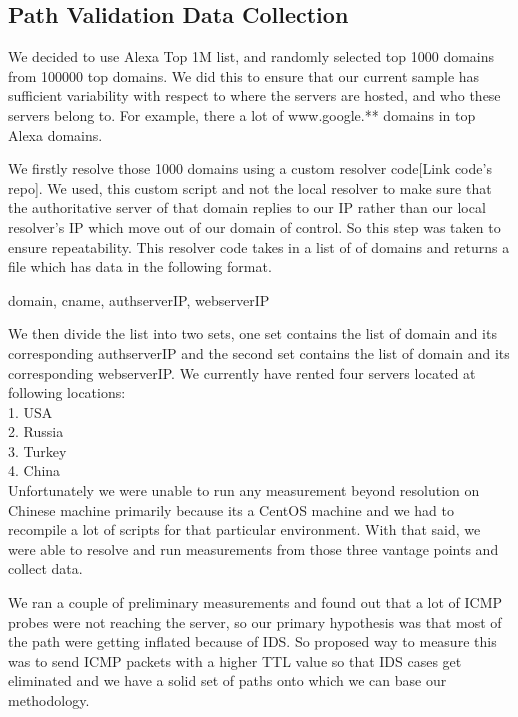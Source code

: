 \subsection{Path Validation Data Collection}
We decided to use Alexa Top 1M list, and randomly selected top 1000 domains from 100000 top domains. We did this to ensure that our current sample has sufficient variability with respect to where the servers are hosted, and who these servers belong to. For example, there a lot of www.google.** domains in top Alexa domains.


We firstly resolve those 1000 domains using a custom resolver code[Link code's repo]. We used, this custom script and not the local resolver to make sure that the authoritative server of that domain replies to our IP rather than our local resolver's IP which move out of our domain of control. So this step was taken to ensure repeatability. This resolver code takes in a list of of domains and returns a file which has data in the following format. \\ 
\begin{center}
   domain, cname, authserverIP, webserverIP \\    
\end{center}
We then divide the list into two sets, one set contains the list of domain and its corresponding authserverIP and the second set contains the list of domain and its corresponding webserverIP. We currently have rented four servers located at following locations: \\
1. USA\\
2. Russia\\
3. Turkey\\
4. China\\

Unfortunately we were unable to run any measurement beyond resolution on Chinese machine primarily because its a CentOS machine and we had to recompile a lot of scripts for that particular environment. With that said, we were able to resolve and run measurements from those three vantage points and collect data. 

We ran a couple of preliminary measurements and found out that a lot of ICMP probes were not reaching the server, so our primary hypothesis was that most of the path were getting inflated because of IDS. So proposed way to measure this was to send ICMP packets with a higher TTL value so that IDS cases get eliminated and we have a solid set of paths onto which we can base our methodology. 


